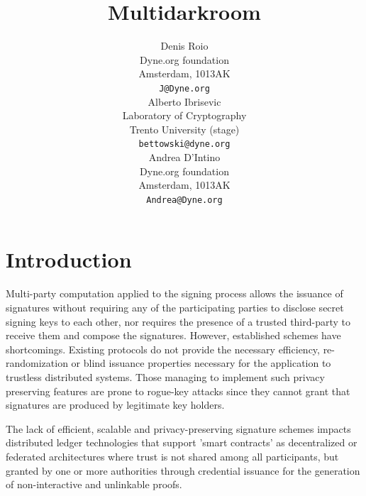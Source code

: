 \documentclass[twocolumn]{article}
\title{Multidarkroom}
\author{
    Denis Roio \\
	Dyne.org foundation \\
	Amsterdam, 1013AK \\
	\texttt{J@Dyne.org} \\
    \And
	Alberto Ibrisevic \\
	Laboratory of Cryptography\\
	Trento University (stage)\\
	\texttt{bettowski@dyne.org} \\
    \And
    Andrea D'Intino \\
    Dyne.org foundation \\
    Amsterdam, 1013AK \\
    \texttt{Andrea@Dyne.org} \\
}
\begin{document}

\section{Introduction}

Multi-party computation applied to the signing process allows the
issuance of signatures without requiring any of the participating
parties to disclose secret signing keys to each other, nor requires the
presence of a trusted third-party to receive them and compose the
signatures. However, established schemes have shortcomings. Existing
protocols do not provide the necessary efficiency, re-randomization or
blind issuance properties necessary for the application to trustless
distributed systems. Those managing to implement such privacy preserving
features are prone to rogue-key attacks \citep{ietf-bls} since they
cannot grant that signatures are produced by legitimate key holders.

The lack of efficient, scalable and privacy-preserving signature schemes
impacts distributed ledger technologies that support 'smart contracts'
as decentralized or federated architectures where trust is not shared
among all participants, but granted by one or more authorities through
credential issuance for the generation of non-interactive and unlinkable
proofs.
\end{document}
